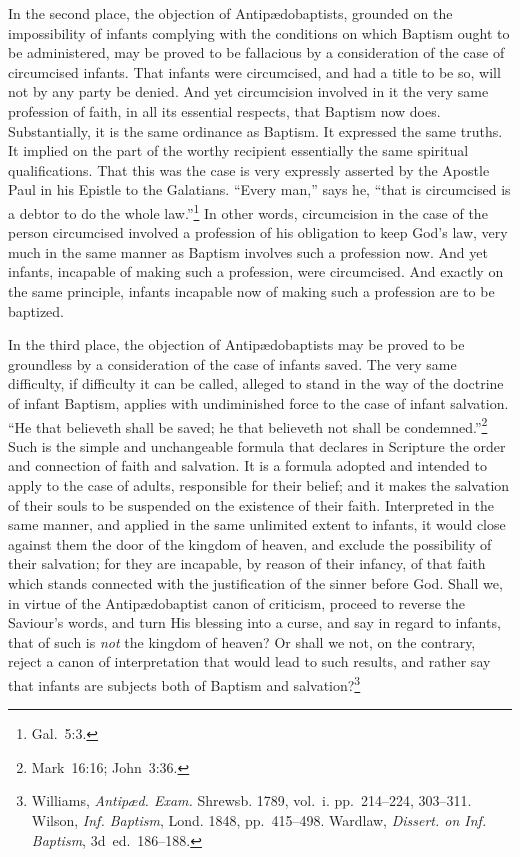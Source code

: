 \documentclass[
  english,
]{book}
\begin{document}
In the second place, the objection of Antipædobaptists, grounded on the impossibility of infants complying with the conditions on which Baptism ought to be administered, may be proved to be fallacious by a consideration of the case of circumcised infants. That infants were circumcised, and had a title to be so, will not by any party be denied. And yet circumcision involved in it the very same profession of faith, in all its essential respects, that Baptism now does. Substantially, it is the same ordinance as Baptism. It expressed the same truths. It implied on the part of the worthy recipient essentially the same spiritual qualifications. That this was the case is very expressly asserted by the Apostle Paul in his Epistle to the Galatians. ``Every man,'' says he, ``that is circumcised is a debtor to do the whole law.''\footnote{Gal.~5:3.} In other words, circumcision in the case of the person circumcised involved a profession of his obligation to keep God's law, very much in the same manner as Baptism involves such a profession now. And yet infants, incapable of making such a profession, were circumcised. And exactly on the same principle, infants incapable now of making such a profession are to be baptized.

In the third place, the objection of Antipædobaptists may be proved to be groundless by a consideration of the case of infants saved. The very same difficulty, if difficulty it can be called, alleged to stand in the way of the doctrine of infant Baptism, applies with undiminished force to the case of infant salvation. ``He that believeth shall be saved; he that believeth not shall be condemned.''\footnote{Mark~16:16; John~3:36.} Such is the simple and unchangeable formula that declares in Scripture the order and connection of faith and salvation. It is a formula adopted and intended to apply to the case of adults, responsible for their belief; and it makes the salvation of their souls to be suspended on the existence of their faith. Interpreted in the same manner, and applied in the same unlimited extent to infants, it would close against them the door of the kingdom of heaven, and exclude the possibility of their salvation; for they are incapable, by reason of their infancy, of that faith which stands connected with the justification of the sinner before God. Shall we, in virtue of the Antipædobaptist canon of criticism, proceed to reverse the Saviour's words, and turn His blessing into a curse, and say in regard to infants, that of such is \emph{not} the kingdom of heaven? Or shall we not, on the contrary, reject a canon of interpretation that would lead to such results, and rather say that infants are subjects both of Baptism and salvation?\footnote{Williams, \emph{Antipæd. Exam.} Shrewsb. 1789, vol.~i. pp.~214--224, 303--311. Wilson, \emph{Inf. Baptism}, Lond. 1848, pp.~415--498. Wardlaw, \emph{Dissert. on Inf. Baptism}, 3d~ed.~186--188.}
\end{document}
